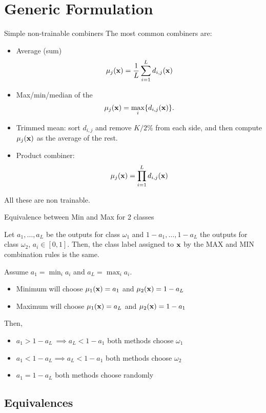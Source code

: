 \documentclass[xcolor=table]{beamer}
\begin{document}
\section{Generic Formulation}
\begin{frame}{Simple non-trainable combiners}
The most common combiners are:
\begin{itemize}
    \item  Average (sum)
    \[
    \mu_j({\mathbf x}) = \frac{1}{L}\sum_{i=1}^L d_{i,j}({\mathbf x})
    \]
    \item Max/min/median of the 
    \[
    \mu_j({\mathbf x}) = \max_i \{d_{i,j}({\mathbf x})\}.
    \]
    \item Trimmed mean: sort \(d_{i,j}\) and remove \(K/2\%\) from each side, and then compute \(\mu_j({\mathbf x})\) as the average of the rest.
    \item Product combiner:
    \[
    \mu_j({\mathbf x}) = \prod_{i=1}^L d_{i,j}({\mathbf x})
    \]
\end{itemize}
    All these are non trainable.
\end{frame}

\begin{frame}{Equivalence between Min and Max for 2 classes}
    \begin{proposition}
    Let \(a_1,\dots,a_L\) be the outputs for class \(\omega_1\) and \(1-a_1,\dots,1-a_L\) the outputs for class \(\omega_2\), \(a_i\in[0,1]\). Then, the class label assigned to \({\mathbf x}\) by the MAX and MIN combination rules is the same.
    \end{proposition}
    \pause
    Assume \(a_1 = \min_i a_i\) and \(a_L = \max_i a_i\). 
    \begin{itemize}
        \item Minimum will choose \(\mu_1({\mathbf x}) = a_1\) and \(\mu_2({\mathbf x}) = 1-a_L\)
        \item Maximum will choose \(\mu_1({\mathbf x}) = a_L\) and \(\mu_2({\mathbf x}) = 1-a_1\)
    \end{itemize}
    \pause
Then,
    \begin{itemize}
        \item \(a_1 > 1- a_L\ \implies a_L < 1- a_1\) both methods choose \(\omega_1\)
        \item \(a_1 < 1- a_L \implies a_L < 1- a_1\) both methods choose \(\omega _2\)
        \item \(a_1 = 1- a_L\) both methods choose randomly
    \end{itemize}
\end{frame}

\subsection{Equivalences}
\end{document}
